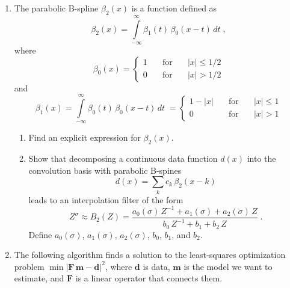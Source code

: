 \begin{enumerate}

\item The parabolic B-spline $\beta_2(x)$ is a function defined as
 \begin{equation}
   \label{eq:b3} 
   \beta_2(x) = \int\limits_{-\infty}^{\infty} \beta_1(t)\,\beta_0(x-t)\,d t\;,
\end{equation}
where
\begin{equation}
   \label{eq:b1}
   \beta_0(x) = \left\{\begin{array}{lcl} 1 & \quad\mbox{for}\quad & |x| \le 1/2 \\
       0 &\quad \mbox{for}\quad& |x| > 1/2\end{array}\right.
 \end{equation}
and
\begin{equation}
  \label{eq:b2} 
   \beta_1(x) = \int\limits_{-\infty}^{\infty} \beta_0(t)\,\beta_0(x-t)\,d t\;
   = \left\{\begin{array}{lcl} 1-|x| &\quad \mbox{for}\quad& |x| \le 1 \\
       0 & \quad \mbox{for}\quad&  |x| > 1\end{array}\right.
\end{equation}

\begin{enumerate}
\item Find an explicit expression for $\beta_2(x)$.
\item Show that decomposing a continuous data function $d(x)$ into the convolution basis 
  with parabolic B-spines
  \begin{equation}
    \label{eq:basis} 
    d(x) = \sum\limits_k c_k\,\beta_2(x-k)
  \end{equation}
  leads to an interpolation filter of the form
  \begin{equation}
    \label{eq:bz}
    Z^{\sigma} \approx B_2(Z) = \frac{a_0(\sigma)\,Z^{-1} + a_1(\sigma) + a_2(\sigma)\,Z}{b_0\,Z^{-1} + b_1 + b_2\,Z}\;.
  \end{equation}
  Define $a_0(\sigma)$, $a_1(\sigma)$, $a_2(\sigma)$, $b_0$, $b_1$, and $b_2$.
\end{enumerate}

\item The following algorithm finds a solution to
  the least-squares optimization problem $\min
  |\mathbf{F}\,\mathbf{m} - \mathbf{d}|^2$, where $\mathbf{d}$ is
  data, $\mathbf{m}$ is the model we want to estimate, and
  $\mathbf{F}$ is a linear operator that connects them.


\end{enumerate}
